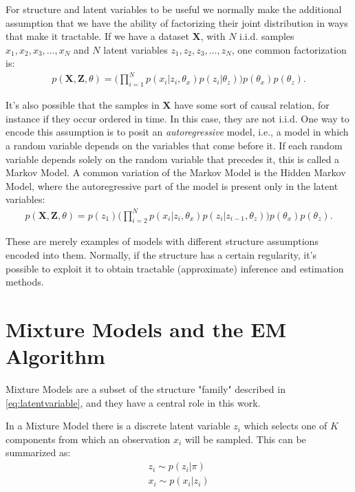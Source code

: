 For structure and latent variables to be useful we normally make the additional
assumption that we have the ability of factorizing their joint distribution in ways that
make it tractable. If we have a dataset $\mathbf{X}$, with $N$ i.i.d. samples $x_1, x_2, x_3, ..., x_N$
and $N$ latent variables $z_1, z_2, z_3, ..., z_N$, one common factorization is:
\begin{align}
    p(\mathbf{X}, \mathbf{Z}, \theta) = \Big(\prod^N_{i=1} p(x_i| z_i, \theta_x) p(z_i | \theta_z)\Big) p(\theta_x) p(\theta_z). \label{eq:latentvariable}
\end{align}

It's also possible that the samples in $\mathbf{X}$ have some sort of causal
relation, for instance if they occur ordered in time. In this case, they are not i.i.d.
One way to encode this assumption is to posit an \emph{autoregressive} model, i.e.,
a model in which a random variable depends on the variables that come before it.
If each random variable depends solely on the random variable that precedes it,
this is called a Markov Model. A common variation of the Markov Model is the
Hidden Markov Model, where the autoregressive part of the model is present only
in the latent variables:
\begin{align}
    p(\mathbf{X}, \mathbf{Z}, \theta) = p(z_1) \Big(\prod^N_{i=2} p(x_i | z_i, \theta_x) p(z_i| z_{i-1}, \theta_z) \Big) p(\theta_x) p(\theta_z).
\end{align}

These are merely examples of models with different structure assumptions encoded
into them. Normally, if the structure has a certain regularity, it's possible
to exploit it to obtain tractable (approximate) inference and estimation methods.

\section{Mixture Models and the EM Algorithm}
\label{section:mmodels}
Mixture Models are a subset of the structure "family" described in \ref{eq:latentvariable},
and they have a central role in this work.

In a Mixture Model there is a discrete latent variable $z_i$ which selects
one of $K$ components from which an observation $x_i$ will be sampled. This
can be summarized as:
\begin{align}
    z_i \sim p(z_i | \pi) \\
    x_i \sim p(x_i | z_i)
\end{align}

